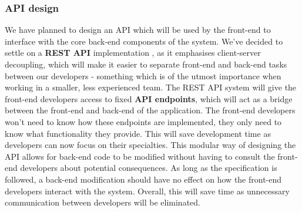 \documentclass[10pt]{article}
\begin{document}
\subsubsection{API design}
We have planned to design an API which will be used by the front-end to
interface with the core back-end components of the system. We've decided to
settle on a \textbf{REST API} implementation \cite{restAPIs}, as it emphasises
client-server decoupling, which will make it easier to separate front-end and
back-end tasks between our developers - something which is of the utmost
importance when working in a smaller, less experienced team. The REST API system
will give the front-end developers access to fixed \textbf{API endpoints}, which
will act as a bridge between the front-end and back-end of the application. The
front-end developers won't need to know how these endpoints are implemented,
they only need to know what functionality they provide. This will save
development time as developers can now focus on their specialties. This modular
way of designing the API allows for back-end code to be modified without having
to consult the front-end developers about potential consequences. As long as the
specification is followed, a back-end modification should have no effect on how
the front-end developers interact with the system. Overall, this will save time
as unnecessary communication between developers will be eliminated.
\end{document}

